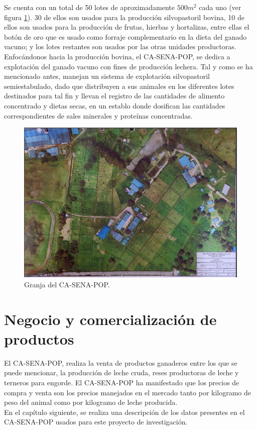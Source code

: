 Se cuenta con un total de 50 lotes de aproximadamente $500m^{2}$ cada uno (ver figura \ref{potrerosenapng}). 30 de ellos son usados para la producción silvopastoril bovina, 10 de ellos son usados para la producción de frutas, hierbas y hortalizas, entre ellas el botón de oro que es usado como forraje complementario en la dieta del ganado vacuno; y los lotes restantes son usados por las otras unidades productoras. Enfocándonos hacia la producción bovina, el CA-SENA-POP, se dedica a explotación del ganado vacuno con fines de producción lechera. Tal y como se ha mencionado antes, manejan un sistema de explotación silvopastoril semiestabulado, dado que distribuyen a sus animales en los diferentes lotes destinados para tal fin y llevan el registro de las cantidades de alimento concentrado y dietas secas, en un establo donde dosifican las cantidades correspondientes de sales minerales y proteínas concentradas.\\

\begin{figure}[H]
	 \begin{center}
	 \includegraphics[scale=0.675]{img/potrerosena.jpg}
	 \end{center}
	 \caption{Granja del CA-SENA-POP. \label{potrerosenapng}}
	\end{figure}
	
\section{Negocio y comercialización de productos}

El CA-SENA-POP, realiza la venta de productos ganaderos entre los que se puede mencionar, la producción de leche cruda, reses productoras de leche y terneros para engorde. El CA-SENA-POP ha manifestado que los precios de compra y venta son los precios manejados en el mercado tanto por kilogramo de peso del animal como por kilogramo de leche producida.\\


En el capítulo siguiente, se realiza una descripción de los datos presentes en el CA-SENA-POP usados para este proyecto de investigación.


